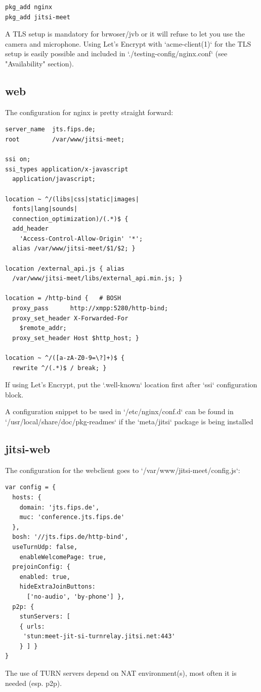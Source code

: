 \documentclass[10pt,conference]{IEEEtran}
\begin{document}
\begin{verbatim}
pkg_add nginx
pkg_add jitsi-meet
\end{verbatim}

A TLS setup is mandatory for brwoser/jvb or it will refuse to let you
use the camera and microphone.
Using Let's Encrypt with `acme-client(1)` for the TLS setup is easily possible and included
in `./testing-config/nginx.conf` (see "Availability" section).

\subsection{web}
The configuration for nginx is pretty straight forward:
\begin{verbatim}
server_name  jts.fips.de;
root         /var/www/jitsi-meet;

ssi on;
ssi_types application/x-javascript
  application/javascript;

location ~ ^/(libs|css|static|images|
  fonts|lang|sounds|
  connection_optimization)/(.*)$ {
  add_header
    'Access-Control-Allow-Origin' '*';
  alias /var/www/jitsi-meet/$1/$2; }

location /external_api.js { alias
  /var/www/jitsi-meet/libs/external_api.min.js; }

location = /http-bind {   # BOSH
  proxy_pass      http://xmpp:5280/http-bind;
  proxy_set_header X-Forwarded-For
    $remote_addr;
  proxy_set_header Host $http_host; }

location ~ ^/([a-zA-Z0-9=\?]+)$ {
  rewrite ^/(.*)$ / break; }
\end{verbatim}

If using Let's Encrypt, put the `.well-known` location first after `ssi` configuration block.

A configuration snippet to be used in `/etc/nginx/conf.d` can be found in
`/usr/local/share/doc/pkg-readmes` if the `meta/jitsi` package is being installed

\subsection{jitsi-web}
The configuration for the webclient goes to `/var/www/jitsi-meet/config.js`:
\begin{verbatim}
var config = {
  hosts: {
    domain: 'jts.fips.de',
    muc: 'conference.jts.fips.de'
  },
  bosh: '//jts.fips.de/http-bind',
  useTurnUdp: false,
  	enableWelcomePage: true,
  prejoinConfig: {
    enabled: true,
    hideExtraJoinButtons:
      ['no-audio', 'by-phone'] },
  p2p: {
    stunServers: [
    { urls:
     'stun:meet-jit-si-turnrelay.jitsi.net:443'
    } ] }
}
\end{verbatim}
The use of TURN servers depend on NAT environment(s), most often it is needed (esp. p2p).
\end{document}

